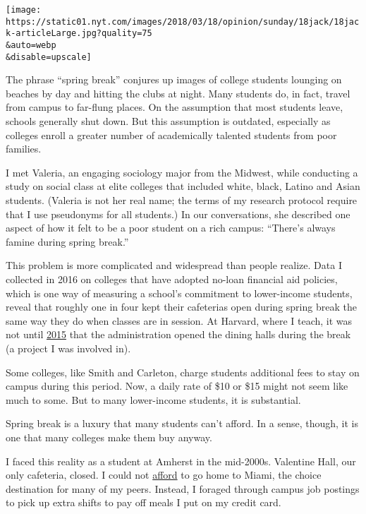\texttt{[image: https://static01.nyt.com/images/2018/03/18/opinion/sunday/18jack/18jack-articleLarge.jpg?quality=75\\\&auto=webp\\\&disable=upscale]}

The phrase ``spring break'' conjures up images of college students
lounging on beaches by day and hitting the clubs at night. Many students
do, in fact, travel from campus to far-flung places. On the assumption
that most students leave, schools generally shut down. But this
assumption is outdated, especially as colleges enroll a greater number
of academically talented students from poor families.

I met Valeria, an engaging sociology major from the Midwest, while
conducting a study on social class at elite colleges that included
white, black, Latino and Asian students. (Valeria is not her real name;
the terms of my research protocol require that I use pseudonyms for all
students.) In our conversations, she described one aspect of how it felt
to be a poor student on a rich campus: ``There's always famine during
spring break.''

This problem is more complicated and widespread than people realize.
Data I collected in 2016 on colleges that have adopted no-loan financial
aid policies, which is one way of measuring a school's commitment to
lower-income students, reveal that roughly one in four kept their
cafeterias open during spring break the same way they do when classes
are in session. At Harvard, where I teach, it was not until
\href{https://www.nytimes.com/2015/04/12/education/edlife/first-generation-students-unite.html}{2015}
that the administration opened the dining halls during the break (a
project I was involved in).

Some colleges, like Smith and Carleton, charge students additional fees
to stay on campus during this period. Now, a daily rate of \$10 or \$15
might not seem like much to some. But to many lower-income students, it
is substantial.

Spring break is a luxury that many students can't afford. In a sense,
though, it is one that many colleges make them buy anyway.

I faced this reality as a student at Amherst in the mid-2000s. Valentine
Hall, our only cafeteria, closed. I could not
\href{http://www.nytimes.com/2007/05/27/education/27grad.html}{afford}
to go home to Miami, the choice destination for many of my peers.
Instead, I foraged through campus job postings to pick up extra shifts
to pay off meals I put on my credit card.

